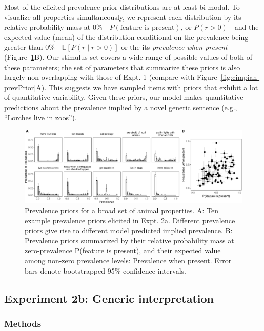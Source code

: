 \documentclass[,man,floatsintext]{apa6}
\theoremstyle{definition}
\theoremstyle{definition}
\theoremstyle{definition}
\theoremstyle{remark}
\begin{document}
Most of the elicited prevalence prior distributions are at least
bi-modal. To visualize all properties simultaneously, we represent each
distribution by its relative probability mass at
0\%---\(P(\text{feature is present})\), or \(P(r > 0)\)---and the
expected value (mean) of the distribution conditional on the prevalence
being greater than 0\%---\(\mathbb{E}[P(r \mid r>0)]\) or the its
\emph{prevalence when present} (Figure~\ref{fig:genInt-prevPrior}B). Our
stimulus set covers a wide range of possible values of both of these
parameters; the set of parameters that summarize these priors is also
largely non-overlapping with those of Expt. 1 (compare with
Figure~\ref{fig:cimpian-prevPrior}A). This suggests we have sampled
items with priors that exhibit a lot of quantitative variability. Given
these priors, our model makes quantitative predictions about the
prevalence implied by a novel generic sentence (e.g., \enquote{Lorches
live in zoos}).

\begin{figure}
\centering
\includegraphics{genint_files/figure-latex/genInt-prevPrior-1.pdf}
\caption{\label{fig:genInt-prevPrior}Prevalence priors for a broad set of
animal properties. A: Ten example prevalence priors elicited in Expt.
2a. Different prevalence priors give rise to different model predicted
implied prevalence. B: Prevalence priors summarized by their relative
probability mass at zero-prevalence P(feature is present), and their
expected value among non-zero prevalence levels: Prevalence when
present. Error bars denote bootstrapped 95\% confidence intervals.}
\end{figure}

\hypertarget{experiment-2b-generic-interpretation}{%
\subsection{Experiment 2b: Generic
interpretation}\label{experiment-2b-generic-interpretation}}

\hypertarget{methods-1}{%
\subsubsection{Methods}\label{methods-1}}
\end{document}
